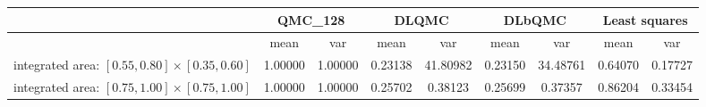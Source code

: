 \begin{tabular}{|l|c|c|c|c|c|c|c|c|}
\hline
 &\multicolumn{2}{c|}{\textbf{QMC\_128}}&\multicolumn{2}{c|}{\textbf{DLQMC}}&\multicolumn{2}{c|}{\textbf{DLbQMC}}&\multicolumn{2}{c|}{\textbf{Least squares}}\\ 
\hline

 &mean&var&mean&var&mean&var&mean&var\\ 
\hline
integrated area: $[0.55,0.80]\times [0.35,0.60]$ &1.00000&1.00000&0.23138&41.80982&0.23150&34.48761&0.64070&0.17727\\ 
\hline
integrated area: $[0.75,1.00]\times [0.75,1.00]$ &1.00000&1.00000&0.25702&0.38123&0.25699&0.37357&0.86204&0.33454\\ 
\hline
\end{tabular}

